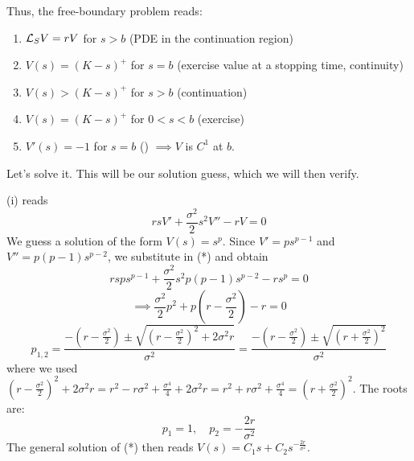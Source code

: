 \begin{remark}
    Thus, the free-boundary problem reads:
    \begin{enumerate}[label=(\roman*)]
        \item $\mathcal{L}_S V = r V$ for $s > b$ (PDE in the continuation region)
        \item $V(s) = (K-s)^+$ for $s = b$ (exercise value at a stopping time, continuity)
        \item $V(s) > (K-s)^+$ for $s > b$ (continuation)
        \item $V(s) = (K-s)^+$ for $0 < s < b$ (exercise)
        \item $V'(s) = -1$ for $s = b$ () $\implies V$ is $C^1$ at $b$.
    \end{enumerate}

    Let's solve it. This will be our solution guess, which we will then verify.
    \begin{center}
    \end{center}
\end{remark}

\begin{remark}
    (i) reads
    \[ r s V' + \frac{\sigma^2}{2} s^2 V'' - r V = 0 \tag{*} \]
    We guess a solution of the form $V(s) = s^p$. Since $V' = p s^{p-1}$ and $V'' = p(p-1) s^{p-2}$, we substitute in (*) and obtain
    \[ r s p s^{p-1} + \frac{\sigma^2}{2} s^2 p(p-1) s^{p-2} - r s^p = 0 \]
    \[ \implies \frac{\sigma^2}{2} p^2 + p \left( r - \frac{\sigma^2}{2} \right) - r = 0 \]
    \[ p_{1,2} = \frac{-(r - \frac{\sigma^2}{2}) \pm \sqrt{(r - \frac{\sigma^2}{2})^2 + 2 \sigma^2 r}}{\sigma^2} = \frac{-(r - \frac{\sigma^2}{2}) \pm \sqrt{(r + \frac{\sigma^2}{2})^2}}{\sigma^2} \]
    where we used $(r - \frac{\sigma^2}{2})^2 + 2 \sigma^2 r = r^2 - r \sigma^2 + \frac{\sigma^4}{4} + 2 \sigma^2 r = r^2 + r \sigma^2 + \frac{\sigma^4}{4} = (r + \frac{\sigma^2}{2})^2$.
    The roots are:
    \[ p_1 = 1, \quad p_2 = -\frac{2r}{\sigma^2} \]
    The general solution of (*) then reads $V(s)=C_{1}s+C_{2}s^{-\frac{2r}{\sigma^2}}$.
\end{remark}

